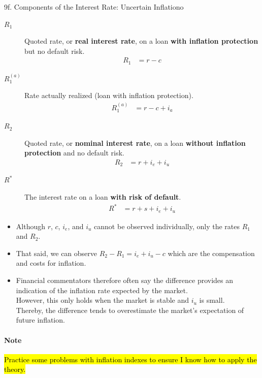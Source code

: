\begin{CHPT_SUMM_AUTO}[label = {L.-9f}]{9f. Components of the Interest Rate: Uncertain Inflationo}
\begin{description}
\end{description}
\begin{description}
	\item[$R_{1}$]	Quoted rate, or \textbf{real interest rate}, on a loan \textbf{with inflation protection} but no default risk.
		\begin{align*}
		R_{1}	&=	r - c
		\end{align*}
	\item[$R_{1}^{(a)}$]	Rate actually realized (loan with inflation protection).
		\begin{align*}
		R_{1}^{(a)}	&=	r - c + i_{a}
		\end{align*}
	\item[$R_{2}$]	Quoted rate, or \textbf{nominal interest rate}, on a loan \textbf{without inflation protection} and no default risk.
		\begin{align*}
		R_{2}	&=	r + i_{e} + i_{u}
		\end{align*}
	\item[$R^{*}$]	The interest rate on a loan \textbf{with risk of default}.
		\begin{align*}
		R^{*}	&=	r + s + i_{e} + i_{u}
		\end{align*}	
\end{description}

\begin{itemize}
	\item	Although $r$, $c$, $i_{e}$, and $i_{u}$ cannot be observed individually, only the rates $R_{1}$ and $R_{2}$. 
	\item	That said, we can observe $R_{2} - R_{1} = i_{e} + i_{u} - c$ which are the compensation and costs for inflation.
	\item	Financial commentators therefore often say the difference provides an indication of the inflation rate expected by the market.\\
			However, this only holds when the market is stable and $i_{u}$ is small.\\
			Thereby, the difference tends to overestimate the market's expectation of future inflation.
\end{itemize}

\paragraph{Note}	\hl{Practice some problems with inflation indexes to ensure I know how to apply the theory.}
\end{CHPT_SUMM_AUTO}

